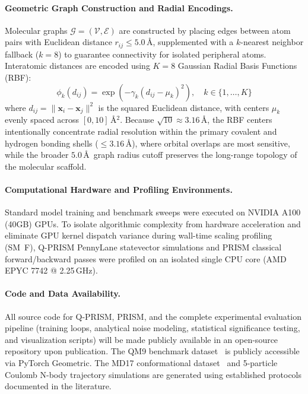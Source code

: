 \documentclass[10pt,twocolumn,letterpaper]{article}
\begin{document}
\paragraph{Geometric Graph Construction and Radial Encodings.}
Molecular graphs $\mathcal{G} = (\mathcal{V}, \mathcal{E})$ are constructed by placing edges between atom pairs with Euclidean distance $r_{ij} \le 5.0$\,\AA, supplemented with a $k$-nearest neighbor fallback ($k = 8$) to guarantee connectivity for isolated peripheral atoms. Interatomic distances are encoded using $K = 8$ Gaussian Radial Basis Functions (RBF):
\begin{equation}
    \phi_k(d_{ij}) = \exp\left(-\gamma_k (d_{ij} - \mu_k)^2\right), \quad k \in \{1, \dots, K\}
\end{equation}
where $d_{ij} = \|\mathbf{x}_i - \mathbf{x}_j\|^2$ is the squared Euclidean distance, with centers $\mu_k$ evenly spaced across $[0, 10]$\,\AA$^2$. Because $\sqrt{10} \approx 3.16$\,\AA, the RBF centers intentionally concentrate radial resolution within the primary covalent and hydrogen bonding shells ($\le 3.16$\,\AA), where orbital overlaps are most sensitive, while the broader $5.0$\,\AA\ graph radius cutoff preserves the long-range topology of the molecular scaffold.

\paragraph{Computational Hardware and Profiling Environments.}
Standard model training and benchmark sweeps were executed on NVIDIA A100 (40GB) GPUs. To isolate algorithmic complexity from hardware acceleration and eliminate GPU kernel dispatch variance during wall-time scaling profiling (SM~F), Q-PRISM PennyLane statevector simulations and PRISM classical forward/backward passes were profiled on an isolated single CPU core (AMD EPYC 7742 @ 2.25\,GHz).

\paragraph{Code and Data Availability.}
All source code for Q-PRISM, PRISM, and the complete experimental evaluation pipeline (training loops, analytical noise modeling, statistical significance testing, and visualization scripts) will be made publicly available in an open-source repository upon publication. The QM9 benchmark dataset~\cite{ramakrishnan2014quantum} is publicly accessible via PyTorch Geometric. The MD17 conformational dataset~\cite{chmielaMachineLearningAccurate2016} and 5-particle Coulomb N-body trajectory simulations are generated using established protocols documented in the literature.
\end{document}
